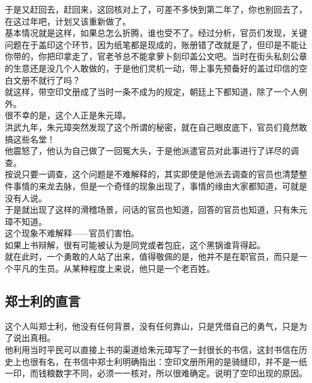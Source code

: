 \begin{multicols}{\theparacolNo}
于是又赶回去，赶回来，这回核对上了，可差不多快到第二年了，你也别回去了，在这过年吧，计划又该重新做了。\\

基本情况就是这样，如果总怎么折腾，谁也受不了。经过分析，官员们发现，关键问题在于盖印这个环节，因为纸笔都是现成的，账册错了改就是了，但印是不能让你带的，你把印拿走了，官老爷总不能拿萝卜刻印盖公文吧。当时在街头私刻公章的生意还是没几个人敢做的，于是他们灵机一动，带上事先预备好的盖过印信的空白文册不就行了吗？\\

就这样，带空印文册成了当时一条不成为的规定，朝廷上下都知道，除了一个人例外。\\

很不幸的是，这个人正是朱元璋。\\

洪武九年，朱元璋突然发现了这个所谓的秘密，就在自己眼皮底下，官员们竟然敢搞这些名堂！\\

他震怒了，他认为自己做了一回冤大头，于是他派遣官员对此事进行了详尽的调查。\\

按说只要一调查，这个问题是不难解释的，其实即使是他派去调查的官员也清楚整件事情的来龙去脉，但是一个奇怪的现象出现了，事情的缘由大家都知道，可就是没有人说。\\

于是就出现了这样的滑稽场景，问话的官员也知道，回答的官员也知道，只有朱元璋不知道。\\

这个现象不难解释——官员们害怕。\\

如果上书辩解，很有可能被认为是同党或者包庇，这个黑锅谁背得起。\\

就在此时，一个勇敢的人站了出来，值得敬佩的是，他并不是在职官员，而只是一个平凡的生员。从某种程度上来说，他只是一个老百姓。\\

\subsection{郑士利的直言}
这个人叫郑士利，他没有任何背景，没有任何靠山，只是凭借自己的勇气，只是为了说出真相。\\

他利用当时平民可以直接上书的渠道给朱元璋写了一封很长的书信，这封书信在历史上也很有名，在书信中郑士利明确指出：空印文册所用的是骑缝印，并不是一纸一印，而钱粮数字不同，必须一一核对，所以很难确定。说明了空印出现的原因。\\


\end{multicols}
